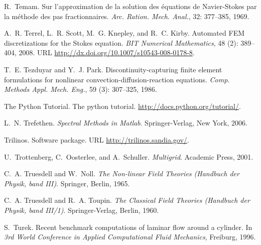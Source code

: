 \begin{thebibliography}{467}
R.~Temam.
\newblock Sur l'approximation de la solution des {\'{e}}quations de
  {N}avier-{S}tokes par la m{\'{e}}thode des pas fractionnaires.
\newblock \emph{Arc. Ration. Mech. Anal.}, 32: 377--385, 1969.

A.~R. Terrel, L.~R. Scott, M.~G. Knepley, and R.~C. Kirby.
\newblock Automated {FEM} discretizations for the {S}tokes equation.
\newblock \emph{BIT Numerical Mathematics}, 48 (2): 389--404,
  2008.
\newblock URL \url{http://dx.doi.org/10.1007/s10543-008-0178-8}.

T.~E. Tezduyar and Y.~J. Park.
\newblock Discontinuity-capturing finite element formulations for nonlinear
  convection-diffusion-reaction equations.
\newblock \emph{Comp. Methods Appl. Mech. Eng.}, 59 (3):
  307--325, 1986.

The Python Tutorial.
\newblock The python tutorial.
\newblock \url{http://docs.python.org/tutorial/}.

L.~N. Trefethen.
\newblock \emph{Spectral Methods in Matlab}.
\newblock Springer-Verlag, New York, 2006.

{Trilinos}.
\newblock Software package.
\newblock URL \url{http://trilinos.sandia.gov/}.

U.~Trottenberg, C.~Oosterlee, and A.~Schuller.
\newblock \emph{Multigrid}.
\newblock Academic Press, 2001.

C.~A. Truesdell and W.~Noll.
\newblock \emph{The {N}on-linear {F}ield {T}heories ({H}andbuch der {P}hysik,
  band {I}{I}{I})}.
\newblock Springer, Berlin, 1965.

C.~A. Truesdell and R.~A. Toupin.
\newblock \emph{The {C}lassical {F}ield {T}heories ({H}andbuch der {P}hysik,
  band {I}{I}{I}/1)}.
\newblock Springer-Verlag, Berlin, 1960.

S.~Turek.
\newblock Recent benchmark computations of laminar flow around a cylinder.
\newblock In \emph{3rd World Conference in Applied Computational Fluid
  Mechanics}, Freiburg, 1996.


\end{thebibliography}
